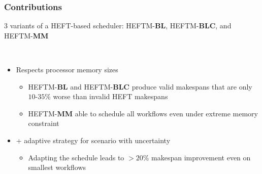 \documentclass[xcolor=svgnames,titlepage,english,presentation]{beamer}
\begin{document}
\begin{frame}[t]
\begin{columns}
{\begin{figure}
        \end{figure}
    }
   
\end{columns}
   


\end{frame}


\begin{frame}[t]
    \frametitle{Contributions}

    3 variants of a HEFT-based scheduler: HEFTM-\textbf{BL}, HEFTM-\textbf{BLC}, and HEFTM-\textbf{MM}

    ~~~~~~~~~~~~~~~~~

    
    \begin{itemize}
        \item Respects processor memory sizes
        \begin{itemize}
            \item HEFTM-\textbf{BL} and HEFTM-\textbf{BLC} produce valid makespans that are only $10$-$35\%$ worse than invalid HEFT makespans
            \item HEFTM-\textbf{MM} able to schedule all workflows even under extreme memory constraint
        \end{itemize}
        
        \item + adaptive strategy for scenario with uncertainty          

        \begin{itemize}
            \item Adapting the schedule leads to $>20\%$ makespan improvement even on smallest workflows
        \end{itemize}
    
    \end{itemize}

    
    

\end{frame}
\end{document}
